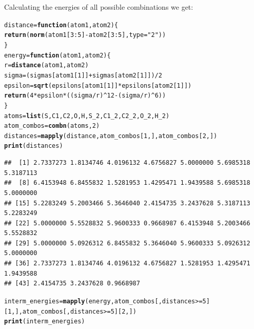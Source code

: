 \documentclass{article}\usepackage[]{graphicx}\usepackage[]{color}
\makeatletter
\newcommand{\hlnum}[1]{\textcolor[rgb]{0.686,0.059,0.569}{#1}}%
\newcommand{\hlstr}[1]{\textcolor[rgb]{0.192,0.494,0.8}{#1}}%
\newcommand{\hlopt}[1]{\textcolor[rgb]{0,0,0}{#1}}%
\newcommand{\hlstd}[1]{\textcolor[rgb]{0.345,0.345,0.345}{#1}}%
\newcommand{\hlkwa}[1]{\textcolor[rgb]{0.161,0.373,0.58}{\textbf{#1}}}%
\newcommand{\hlkwb}[1]{\textcolor[rgb]{0.69,0.353,0.396}{#1}}%
\newcommand{\hlkwc}[1]{\textcolor[rgb]{0.333,0.667,0.333}{#1}}%
\newcommand{\hlkwd}[1]{\textcolor[rgb]{0.737,0.353,0.396}{\textbf{#1}}}%
\newenvironment{kframe}{%
 \def\at@end@of@kframe{}%
 \ifinner\ifhmode%
  \def\at@end@of@kframe{\end{minipage}}%
  \begin{minipage}{\columnwidth}%
 \fi\fi%
 \def\FrameCommand##1{\hskip\@totalleftmargin \hskip-\fboxsep
 \colorbox{shadecolor}{##1}\hskip-\fboxsep
     \hskip-\linewidth \hskip-\@totalleftmargin \hskip\columnwidth}%
 \MakeFramed {\advance\hsize-\width
   \@totalleftmargin\z@ \linewidth\hsize
   \@setminipage}}%
 {\par\unskip\endMakeFramed%
 \at@end@of@kframe}
\newenvironment{knitrout}{}{} %
\makeatother
\begin{document}
Calculating the energies of all possible combinations we get:

\begin{knitrout}
\color{fgcolor}\begin{kframe}
\begin{alltt}
  \hlstd{distance}\hlkwb{=}\hlkwa{function}\hlstd{(}\hlkwc{atom1}\hlstd{,}\hlkwc{atom2}\hlstd{)\{}
    \hlkwd{return}\hlstd{(}\hlkwd{norm}\hlstd{(atom1[}\hlnum{3}\hlopt{:}\hlnum{5}\hlstd{]}\hlopt{-}\hlstd{atom2[}\hlnum{3}\hlopt{:}\hlnum{5}\hlstd{],}\hlkwc{type}\hlstd{=}\hlstr{"2"}\hlstd{))}
  \hlstd{\}}
  \hlstd{energy}\hlkwb{=}\hlkwa{function}\hlstd{(}\hlkwc{atom1}\hlstd{,}\hlkwc{atom2}\hlstd{)\{}
    \hlstd{r}\hlkwb{=}\hlkwd{distance}\hlstd{(atom1,atom2)}
    \hlstd{sigma} \hlkwb{=} \hlstd{(sigmas[atom1[}\hlnum{1}\hlstd{]]}\hlopt{+}\hlstd{sigmas[atom2[}\hlnum{1}\hlstd{]])}\hlopt{/}\hlnum{2}
    \hlstd{epsilon} \hlkwb{=} \hlkwd{sqrt}\hlstd{(epsilons[atom1[}\hlnum{1}\hlstd{]]}\hlopt{*}\hlstd{epsilons[atom2[}\hlnum{1}\hlstd{]])}
    \hlkwd{return}\hlstd{(}\hlnum{4}\hlopt{*}\hlstd{epsilon}\hlopt{*}\hlstd{((sigma}\hlopt{/}\hlstd{r)}\hlopt{^}\hlnum{12}\hlopt{-}\hlstd{(sigma}\hlopt{/}\hlstd{r)}\hlopt{^}\hlnum{6}\hlstd{))}
  \hlstd{\}}
  \hlstd{atoms} \hlkwb{=} \hlkwd{list}\hlstd{(S,C1,C2,O,H,S_2,C1_2,C2_2,O_2,H_2)}
  \hlstd{atom_combos} \hlkwb{=} \hlkwd{combn}\hlstd{(atoms,}\hlnum{2}\hlstd{)}
  \hlstd{distances}\hlkwb{=}\hlkwd{mapply}\hlstd{(distance,atom_combos[}\hlnum{1}\hlstd{,],atom_combos[}\hlnum{2}\hlstd{,])}
  \hlkwd{print}\hlstd{(distances)}
\end{alltt}
\begin{verbatim}
##  [1] 2.7337273 1.8134746 4.0196132 4.6756827 5.0000000 5.6985318 5.3187113
##  [8] 6.4153948 6.8455832 1.5281953 1.4295471 1.9439588 5.6985318 5.0000000
## [15] 5.2283249 5.2003466 5.3646040 2.4154735 3.2437628 5.3187113 5.2283249
## [22] 5.0000000 5.5528832 5.9600333 0.9668987 6.4153948 5.2003466 5.5528832
## [29] 5.0000000 5.0926312 6.8455832 5.3646040 5.9600333 5.0926312 5.0000000
## [36] 2.7337273 1.8134746 4.0196132 4.6756827 1.5281953 1.4295471 1.9439588
## [43] 2.4154735 3.2437628 0.9668987
\end{verbatim}
\begin{alltt}
  \hlstd{interm_energies} \hlkwb{=} \hlkwd{mapply}\hlstd{(energy,atom_combos[,distances}\hlopt{>=}\hlnum{5}\hlstd{][}\hlnum{1}\hlstd{,],atom_combos[,distances}\hlopt{>=}\hlnum{5}\hlstd{][}\hlnum{2}\hlstd{,])}
  \hlkwd{print}\hlstd{(interm_energies)}
\end{alltt}

\end{kframe}
\end{knitrout}
\end{document}
